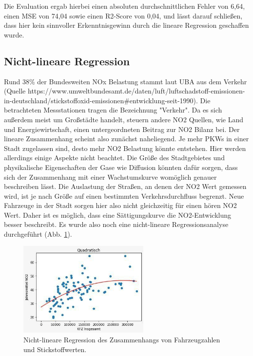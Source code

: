 \documentclass[11pt,a4paper,oneside,german]{article}
\begin{document}
	Die Evaluation ergab hierbei einen absoluten durchschnittlichen Fehler von 6,64, einen MSE von 74,04 sowie einen R2-Score von 0,04, und lässt darauf schließen, dass hier kein sinnvoller Erkenntnisgewinn durch die lineare Regression geschaffen wurde.
	
	\subsection{Nicht-lineare Regression}
	
	Rund 38\% der Bundesweiten NOx Belastung stammt laut UBA aus dem Verkehr (Quelle https://www.umweltbundesamt.de/daten/luft/luftschadstoff-emissionen-in-deutschland/stickstoffoxid-emissionen\#entwicklung-seit-1990). Die betrachteten Messstationen tragen die Bezeichnung "Verkehr". Da es sich außerdem meist um Großstädte handelt, steuern andere NO2 Quellen, wie Land und Energiewirtschaft, einen untergeordneten Beitrag zur NO2 Bilanz bei. Der lineare Zusammenhang scheint also zunächst naheliegend. Je mehr PKWs in einer Stadt zugelassen sind, desto mehr NO2 Belastung könnte entstehen. Hier werden allerdings einige Aspekte nicht beachtet. Die Größe des Stadtgebietes und physikalische Eigenschaften der Gase wie Diffusion könnten dafür sorgen, dass sich der Zusammenhang mit einer Wachstumskurve womöglich genauer beschreiben lässt. Die Auslastung der Straßen, an denen der NO2 Wert gemessen wird, ist je nach Größe auf einen bestimmten Verkehrsdurchfluss begrenzt. Neue Fahrzeuge in der Stadt sorgen hier also nicht gleichzeitig für einen hören NO2 Wert. Daher ist es möglich, dass eine Sättigungskurve die NO2-Entwicklung besser beschreibt. Es wurde also noch eine nicht-lineare Regressionsanalyse durchgeführt (Abb. \ref{fig:nonlinreg}).
	
	\begin{figure}[H]
	\centering
	\includegraphics[width=6.5cm]{nonlinreg.jpg}
	\caption{Nicht-lineare Regression des Zusammenhangs von Fahrzeugzahlen und Stickstoffwerten.}
	\label{fig:nonlinreg}
	\end{figure}
	
\end{document}
